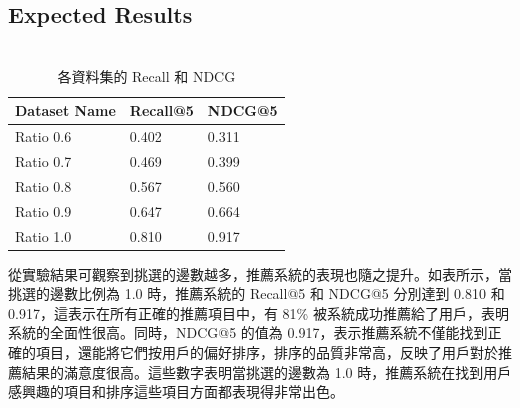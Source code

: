     \subsection{Expected Results}
    \begin{table}[h]
        \centering
        \caption{\\ 各資料集的 Recall 和 NDCG}
        \begin{tabular}{lll}
        \toprule
        \textbf{Dataset Name} & \textbf{Recall@5} & \textbf{NDCG@5} \\
        \hline
        Ratio 0.6 & 0.402 & 0.311 \\
        \hline
        Ratio 0.7 & 0.469 & 0.399 \\
        \hline
        Ratio 0.8 & 0.567 & 0.560\\ 
        \hline
        Ratio 0.9 & 0.647 & 0.664 \\
        \hline
        Ratio 1.0 & 0.810 & 0.917 \\
        \hline
        \end{tabular}
        \label{table3}
    \end{table}
    從實驗結果可觀察到挑選的邊數越多，推薦系統的表現也隨之提升。如表所示，當挑選的邊數比例為 1.0 時，推薦系統的 Recall@5 和 NDCG@5 分別達到 0.810 和 0.917，這表示在所有正確的推薦項目中，有 81\% 被系統成功推薦給了用戶，表明系統的全面性很高。同時，NDCG@5 的值為 0.917，表示推薦系統不僅能找到正確的項目，還能將它們按用戶的偏好排序，排序的品質非常高，反映了用戶對於推薦結果的滿意度很高。這些數字表明當挑選的邊數為 1.0 時，推薦系統在找到用戶感興趣的項目和排序這些項目方面都表現得非常出色。
